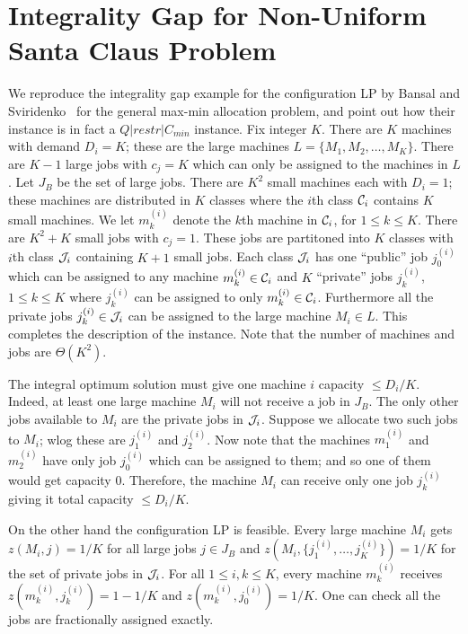 \documentclass{llncs}
\begin{document}

\section{Integrality Gap for Non-Uniform Santa Claus Problem}\label{sec:app-bsig}
We reproduce the integrality gap example for the configuration LP by Bansal and Sviridenko~\cite{BansalS06} for the general max-min allocation problem, and point out how their instance is in fact a $Q|restr|C_{min}$ instance.
Fix integer $K$. There are $K$ machines with demand $D_i = K$; these are the large machines $L = \{M_1,M_2,\ldots,M_K\}$. There are $K-1$ large jobs with $c_j = K$ which can only be assigned to the machines in $L$.
Let $J_B$ be the set of large jobs. There are $K^2$ small machines each with $D_i = 1$; these machines are distributed in $K$ classes where the $i$th class ${\cal C}_i$ contains $K$ small machines. We let $m^{(i)}_k$ denote the $k$th machine in ${\cal C}_i$, for $1\leq k\leq K$.
There are $K^2 + K$ small jobs with $c_j = 1$. These jobs are partitoned into $K$ classes with $i$th class ${\cal J}_i$ containing $K+1$ small jobs. Each class ${\cal J}_i$ has one ``public'' job $j^{(i)}_0$ which can be assigned to any machine $m^{(i)}_k \in {\cal C}_i$
 and $K$ ``private'' jobs $j^{(i)}_k$, $1\leq k\leq K$ where $j^{(i)}_k$ can be assigned to only $m^{(i)}_k \in {\cal C}_i$. Furthermore all the private jobs $j^{(i)}_k\in {\cal J}_i$ can be assigned to the large machine $M_i \in L$. This completes the description of the instance.
Note that the number of machines and jobs are $\Theta(K^2)$.

The integral optimum solution must give one machine $i$ capacity $\leq D_i/K$. Indeed, at least one large machine $M_i$ will not receive a job in $J_B$.
The only other jobs available to $M_i$ are the private jobs in ${\cal J}_i$. Suppose we allocate two such jobs to $M_i$; wlog these are $j^{(i)}_1$ and $j^{(i)}_2$. Now note
that the machines $m^{(i)}_1$ and $m^{(i)}_2$ have only job $j^{(i)}_0$ which can be assigned to them; and so one of them would get capacity $0$.
Therefore, the machine $M_i$ can receive only one job $j^{(i)}_k$ giving it total capacity $\leq D_i/K$.

On the other hand the configuration LP is feasible. Every large machine $M_i$ gets $z(M_i, j) = 1/K$ for all large jobs $j\in J_B$ and $z(M_i,\{j^{(i)}_1,\ldots, j^{(i)}_K\}) = 1/K$ for the set of private jobs in ${\cal J}_i$.
For all $1\leq i,k\leq K$, every machine $m^{(i)}_k$ receives $z(m^{(i)}_k,j^{(i)}_k) = 1-1/K$ and $z(m^{(i)}_k,j^{(i)}_0) = 1/K$. One can check all the jobs are fractionally assigned exactly.
\end{document}
